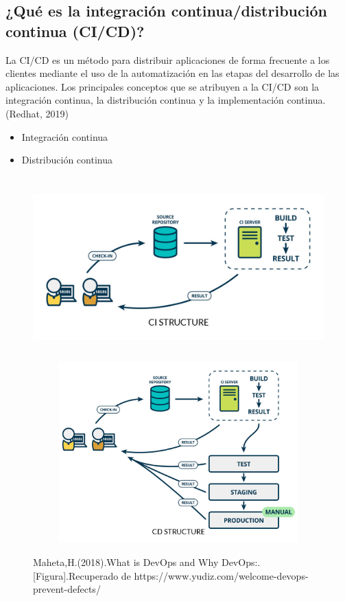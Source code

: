\documentclass[preprint,12pt]{elsarticle}
\begin{document}
\subsection{¿Qué es la integración continua/distribución continua (CI/CD)?}	
La CI/CD es un método para distribuir aplicaciones de forma frecuente a los clientes mediante el uso de la automatización en las etapas del desarrollo de las aplicaciones. Los principales conceptos que se atribuyen a la CI/CD son la integración continua, la distribución continua y la implementación continua.(Redhat, 2019) 
\begin{itemize}
\item Integración continua 
\item Distribución continua
\end{itemize}
	\begin{figure}[H]
			\begin{center}
					\includegraphics[width=12cm,height=7cm]{./IMAGENES/devops2}
					\includegraphics[width=12cm,height=7cm]{./IMAGENES/devops3}
			\end{center}
			Maheta,H.(2018).What is DevOps and Why DevOps:.[Figura].Recuperado de 
https://www.yudiz.com/welcome-devops-prevent-defects/
		\end{figure}
\end{document}
